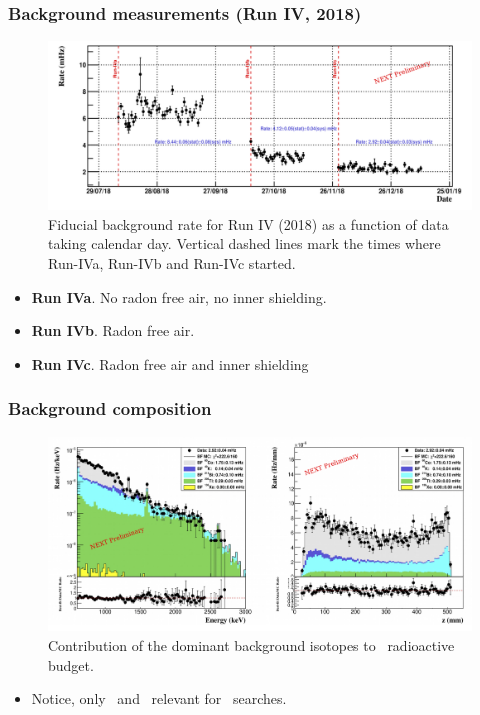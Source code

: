 

\begin{frame}
\frametitle{Background measurements (Run IV, 2018)} 
\begin{figure}
  \begin{center}
    \includegraphics[scale=0.4]{moriond/run4_fid_rate.png}
    \caption{Fiducial background rate for Run IV (2018) as a function of data taking calendar day. Vertical dashed lines mark the times where Run-IVa, Run-IVb and Run-IVc started.}
    \label{fig:rate}
  \end{center}
\end{figure}
\begin{itemize}
\item {\bf Run IVa}. No radon free air, no inner shielding. 
\item {\bf Run IVb}. Radon free air. 
\item {\bf Run IVc}. Radon free air and inner shielding
\end{itemize}
\end{frame}

\begin{frame}
\frametitle{Background composition} 
\begin{figure}
  \begin{center}
    \includegraphics[scale=0.4]{moriond/bkgnd_fit.png}
    \caption{Contribution of the dominant background isotopes to \NEW\ radioactive budget.}
    \label{fig:rate}
  \end{center}
\end{figure}
\begin{itemize}
\item Notice, only \BI\ and \TL\ relevant for \bbonu\ searches. 
\end{itemize}
\end{frame}

